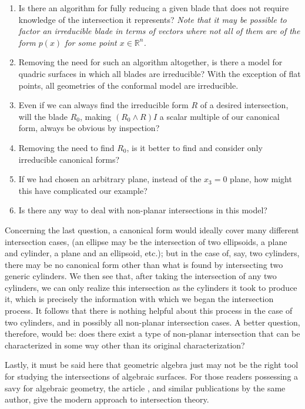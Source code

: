 \documentclass{birkjour}
\theoremstyle{definition}
\theoremstyle{remark}
\numberwithin{equation}{section}
\newcommand{\R}{\mathbb{R}}
\begin{document}
\begin{enumerate}

\item Is there an algorithm for fully reducing a given blade that does not
require knowledge of the intersection it represents?  {\it Note that it may
be possible to factor an irreducible blade in terms of vectors where not all
of them are of the form $p(x)$ for some point $x\in\R^n$.}

\item Removing the need for such an algorithm altogether, is there a model
for quadric surfaces in which all blades are irreducible?  With the exception
of flat points, all geometries of the conformal model are irreducible.

\item Even if we can always find the irreducible form $R$ of a desired intersection,
will the blade $R_0$, making $(R_0\wedge R)I$ a scalar multiple of our canonical
form, always be obvious by inspection?

\item Removing the need to find $R_0$, is it better to find and consider
only irreducible canonical forms?

\item If we had chosen an arbitrary plane,
instead of the $x_3=0$ plane, how might this have complicated our example?

\item Is there any way to deal with non-planar intersections in this model?
\end{enumerate}

Concerning the last question, a canonical
form would ideally cover many different intersection cases, (an ellipse
may be the intersection of two ellipsoids, a plane and cylinder, a plane and an ellipsoid, etc.); but
in the case of, say, two cylinders, there may be no canonical form other than what
is found by intersecting two generic cylinders.  We then see that,
after taking the intersection of any two cylinders, we can only realize this
intersection as the cylinders it took to produce it, which is precisely the
information with which we began the intersection process.  It follows that
there is nothing helpful about this process in the case of two cylinders,
and in possibly all non-planar intersection cases.  A better question, therefore,
would be: does there exist a type of non-planar intersection that
can be characterized in some way other than its original characterization?

Lastly, it must be said here that geometric algebra just may not be the right tool
for studying the intersections of algebraic surfaces.  For those readers possessing a savy
for algebraic geometry, the article \cite{Fulton83}, and similar publications by the same author,
give the modern approach to intersection theory.
\end{document}
